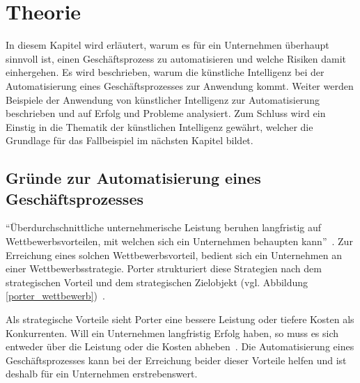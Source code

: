 \section{Theorie}

In diesem Kapitel wird erläutert, warum es für ein Unternehmen überhaupt sinnvoll ist, einen Geschäftsprozess zu automatisieren und welche Risiken damit einhergehen. Es wird beschrieben, warum die künstliche Intelligenz bei der Automatisierung eines Geschäftsprozesses zur Anwendung kommt. Weiter werden Beispiele der Anwendung von künstlicher Intelligenz zur Automatisierung beschrieben und auf Erfolg und Probleme analysiert. Zum Schluss wird ein Einstig in die Thematik der künstlichen Intelligenz gewährt, welcher die Grundlage für das Fallbeispiel im nächsten Kapitel bildet.


\subsection{Gründe zur Automatisierung eines Geschäftsprozesses}

\enquote{Überdurchschnittliche unternehmerische Leistung beruhen langfristig auf Wettbewerbsvorteilen, mit welchen sich ein Unternehmen behaupten kann}~\autocite[104]{Capaul2010}. Zur Erreichung eines solchen Wettbewerbsvorteil, bedient sich ein Unternehmen an einer Wettbewerbsstrategie. Porter   strukturiert diese Strategien nach dem strategischen Vorteil und dem strategischen Zielobjekt (vgl. Abbildung \ref{porter_wettbewerb})~\autocite{Capaul2010}. 

Als strategische Vorteile sieht Porter eine bessere Leistung oder tiefere Kosten als Konkurrenten. Will ein Unternehmen langfristig Erfolg haben, so muss es sich entweder über die Leistung oder die Kosten abheben~\autocite{Capaul2010}. Die Automatisierung eines Geschäftsprozesses kann bei der Erreichung beider dieser Vorteile helfen und ist deshalb für ein Unternehmen erstrebenswert. 


